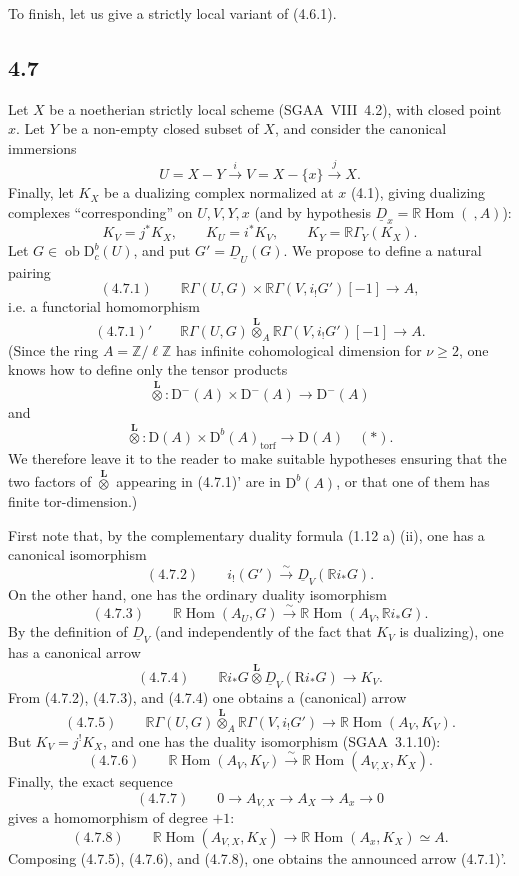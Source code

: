 \documentclass[11pt]{article}
\DeclareMathOperator{\Hom}{Hom}
\newcommand{\R}{\mathrm{R}}
\newcommand{\D}{\mathrm{D}}
\newcommand{\Z}{\mathbb{Z}}
\newcommand{\ob}{\operatorname{ob}}
\providecommand{\Hom}{\operatorname{Hom}}
\providecommand{\ob}{\operatorname{ob}}
\providecommand{\R}{\mathrm R}
\providecommand{\Z}{\mathbb Z}
\providecommand{\Hom}{\operatorname{Hom}}
\begin{document}
To finish, let us give a strictly local variant of (4.6.1).

\subsection*{4.7}
Let $X$ be a noetherian strictly local scheme (SGAA~VIII~4.2), with closed point $x$. Let $Y$ be a non-empty closed subset of $X$, and consider the canonical immersions
\[
U=X-Y\xrightarrow{i}V=X-\{x\}\xrightarrow{j}X.
\]
Finally, let $K_X$ be a dualizing complex normalized at $x$ (4.1), giving dualizing complexes ``corresponding'' on $U,V,Y,x$ (and by hypothesis $\underline{D}_x=\mathbb{R}\Hom(\ ,A)$):
\[
K_V=j^*K_X,
\qquad K_U=i^*K_V,
\qquad K_Y=\mathbb{R}\Gamma_Y(K_X).
\]
Let $G\in\ob\D_c^b(U)$, and put $G'=\underline{D}_U(G)$. We propose to define a natural pairing
\[
(4.7.1)\qquad \mathbb{R}\Gamma(U,G)\times \mathbb{R}\Gamma(V,i_!G')[-1]\longrightarrow A,
\]
i.e. a functorial homomorphism
\[
(4.7.1)'\qquad \mathbb{R}\Gamma(U,G)\overset{\mathbf L}{\otimes}_A\mathbb{R}\Gamma(V,i_!G')[-1]\longrightarrow A.
\]
(Since the ring $A=\Z/\ell\Z$ has infinite cohomological dimension for $\nu\geqslant2$, one knows how to define only the tensor products
\[
\overset{\mathbf L}{\otimes}:\D^-(A)\times\D^-(A)\longrightarrow\D^-(A)
\]
and
\[
\overset{\mathbf L}{\otimes}:\D(A)\times\D^b(A)_{\mathrm{torf}}\longrightarrow\D(A)\quad(*).
\]
We therefore leave it to the reader to make suitable hypotheses ensuring that the two factors of $\overset{\mathbf L}{\otimes}$ appearing in (4.7.1)' are in $\D^b(A)$, or that one of them has finite tor-dimension.)

First note that, by the complementary duality formula (1.12 a) (ii), one has a canonical isomorphism
\[
(4.7.2)\qquad i_!(G')\xrightarrow{\sim}\underline{D}_V(\mathbb{R} i_*G).
\]
On the other hand, one has the ordinary duality isomorphism
\[
(4.7.3)\qquad \mathbb{R}\Hom(A_U,G)\xrightarrow{\sim}\mathbb{R}\Hom(A_V,\mathbb{R} i_*G).
\]
By the definition of $\underline{D}_V$ (and independently of the fact that $K_V$ is dualizing), one has a canonical arrow
\[
(4.7.4)\qquad \mathbb{R} i_*G\overset{\mathbf L}{\otimes}\underline{D}_V(\R i_*G)\longrightarrow K_V.
\]
From (4.7.2), (4.7.3), and (4.7.4) one obtains a (canonical) arrow
\[
(4.7.5)\qquad \mathbb{R}\Gamma(U,G)\overset{\mathbf L}{\otimes}_A\mathbb{R}\Gamma(V,i_!G')\longrightarrow \mathbb{R}\Hom(A_V,K_V).
\]
But $K_V=j^!K_X$, and one has the duality isomorphism (SGAA~3.1.10):
\[
(4.7.6)\qquad \mathbb{R}\Hom(A_V,K_V)\xrightarrow{\sim}\mathbb{R}\Hom(A_{V,X},K_X).
\]
Finally, the exact sequence
\[
(4.7.7)\qquad 0\longrightarrow A_{V,X}\longrightarrow A_X\longrightarrow A_x\longrightarrow 0
\]
gives a homomorphism of degree $+1$:
\[
(4.7.8)\qquad \mathbb{R}\Hom(A_{V,X},K_X)\longrightarrow \mathbb{R}\Hom(A_x,K_X)\simeq A.
\]
Composing (4.7.5), (4.7.6), and (4.7.8), one obtains the announced arrow (4.7.1)'.
\end{document}
